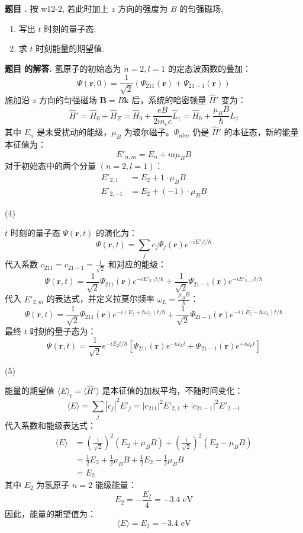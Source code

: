 \documentclass[12pt, a4paper, oneside]{ctexart}
\newcounter{problemname}
\newenvironment{problem}
  {\begin{shaded}\stepcounter{problemname}\par\noindent\textbf{题目 \theproblemname. }}
  {\end{shaded}\par}
\newenvironment{solution}
  {\par\noindent\textbf{题目 \theproblemname 的解答. }}
  {\par}
\begin{document}
\begin{problem}
  按 w12-2, 若此时加上 $z$ 方向的强度为 $B$ 的匀强磁场,
\begin{enumerate}
    \item[(4)] 写出 $t$ 时刻的量子态;
    \item[(5)] 求 $t$ 时刻能量的期望值.
\end{enumerate}
\end{problem}

\begin{solution}
  氢原子的初始态为 $n=2, l=1$ 的定态波函数的叠加：
$$
\Psi(\mathbf{r}, 0) = \frac{1}{\sqrt{2}} \left( \Psi_{211}(\mathbf{r}) + \Psi_{21-1}(\mathbf{r}) \right)
$$
施加沿 $z$ 方向的匀强磁场 $\mathbf{B} = B \mathbf{k}$ 后，系统的哈密顿量 $\hat{H}'$ 变为：
$$
\hat{H}' = \hat{H}_0 + \hat{H}_Z = \hat{H}_0 + \frac{e B}{2 m_e c} \hat{L}_z = \hat{H}_0 + \frac{\mu_B B}{\hbar} \hat{L}_z
$$
其中 $E_n$ 是未受扰动的能级，$\mu_B$ 为玻尔磁子。$\Psi_{n l m}$ 仍是 $\hat{H}'$ 的本征态，新的能量本征值为：
$$
E'_{n, m} = E_n + m \mu_B B
$$
对于初始态中的两个分量 $(n=2, l=1)$：
\begin{align*}
E'_{2, 1} &= E_2 + 1 \cdot \mu_B B \\
E'_{2, -1} &= E_2 + (-1) \cdot \mu_B B
\end{align*}

(4)

$t$ 时刻的量子态 $\Psi(\mathbf{r}, t)$ 的演化为：
$$
\Psi(\mathbf{r}, t) = \sum_{j} c_j \Psi_j(\mathbf{r}) e^{-i E'_j t / \hbar}
$$
代入系数 $c_{211} = c_{21-1} = \frac{1}{\sqrt{2}}$ 和对应的能级：
$$
\Psi(\mathbf{r}, t) = \frac{1}{\sqrt{2}} \Psi_{211}(\mathbf{r}) e^{-i E'_{2, 1} t / \hbar} + \frac{1}{\sqrt{2}} \Psi_{21-1}(\mathbf{r}) e^{-i E'_{2, -1} t / \hbar}
$$
代入 $E'_{2, m}$ 的表达式，并定义拉莫尔频率 $\omega_L = \frac{\mu_B B}{\hbar}$：
$$
\Psi(\mathbf{r}, t) = \frac{1}{\sqrt{2}} \Psi_{211}(\mathbf{r}) e^{-i (E_2 + \hbar \omega_L) t / \hbar} + \frac{1}{\sqrt{2}} \Psi_{21-1}(\mathbf{r}) e^{-i (E_2 - \hbar \omega_L) t / \hbar}
$$
最终 $t$ 时刻的量子态为：
$$
\Psi(\mathbf{r}, t) = \frac{1}{\sqrt{2}} e^{-i E_2 t / \hbar} \left[ \Psi_{211}(\mathbf{r}) e^{-i \omega_L t} + \Psi_{21-1}(\mathbf{r}) e^{+i \omega_L t} \right]
$$

(5)

能量的期望值 $\langle E \rangle_t = \langle \hat{H}' \rangle$ 是本征值的加权平均，不随时间变化：
$$
\langle E \rangle = \sum_{j} |c_j|^2 E'_j = |c_{211}|^2 E'_{2, 1} + |c_{21-1}|^2 E'_{2, -1}
$$
代入系数和能级表达式：
\begin{align*}
\langle E \rangle &= \left(\frac{1}{\sqrt{2}}\right)^2 (E_2 + \mu_B B) + \left(\frac{1}{\sqrt{2}}\right)^2 (E_2 - \mu_B B) \\
&= \frac{1}{2} E_2 + \frac{1}{2} \mu_B B + \frac{1}{2} E_2 - \frac{1}{2} \mu_B B \\
&= E_2
\end{align*}
其中 $E_2$ 为氢原子 $n=2$ 能级能量：
$$
E_2 = -\frac{E_I}{4} = -3.4 \text{ eV}
$$
因此，能量的期望值为：
$$
\langle E \rangle = E_2 = -3.4 \text{ eV}
$$
\end{solution}
\end{document}
